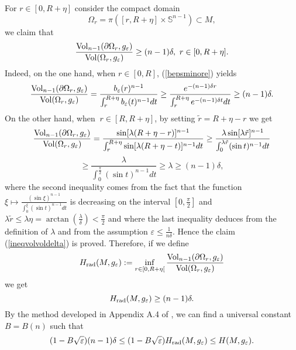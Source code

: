 \documentclass[11pt, reqno]{amsart}
\theoremstyle{plain}
\begin{document}
For $r\in [0, R+\eta]$  consider the compact domain
$$\Omega_r=\pi ( [r, R+\eta]\times \mathbb S^{n-1})\subset M,$$
we claim that   
\begin{equation}\label{ineqvolvoldelta}
\frac{{\rm Vol}_{n-1}(\partial\Omega_r, g_{\varepsilon})}{{\rm Vol} (\Omega_r, g_{\varepsilon})}\geq (n-1)\delta, \ r\in [0, R+\eta].
\end{equation}
Indeed, on the one hand,   when  $r\in [0, R]$, 
(\ref{bepsminore}) 
yields 
$$\frac{{\rm Vol}_{n-1}(\partial\Omega_r, g_{\varepsilon})}{{\rm Vol} (\Omega_r, g_{\varepsilon})}=\frac{b_{\varepsilon}(r)^{n-1}}{\int_r^{R+\eta}b_{\varepsilon}(t)^{n-1}dt}
\geq \frac{e^{-(n-1)\delta r}}{\int_r^{R+\eta}e^{-(n-1)\delta t}dt}
\geq (n-1)\delta .$$
On the other  hand,  when $\ r\in [R, R+\eta]$, by setting $\tilde r=R+\eta -r$ we get
$$\frac{{\rm Vol}_{n-1}(\partial\Omega_r, g_{\varepsilon})}{{\rm Vol} (\Omega_r, g_{\varepsilon})}=\frac{\sin[\lambda (R+\eta -r)]^{n-1}}{\int_r^{R+\eta}\sin[\lambda (R+\eta -t)]^{n-1}dt}
\geq \frac{\lambda\sin[\lambda \tilde r]^{n-1}}{\int_0^{\lambda\tilde r}(\sin t)^{n-1}dt}$$
$$\geq \frac{\lambda}{\int_0^{\frac{\pi}{2}}(\sin t)^{n-1}dt}\geq \lambda
\geq (n-1)\delta ,$$
where the second inequality comes from the fact that the function $\xi \mapsto 
\frac{(\sin \xi )^{n-1}}{\int_0^{\xi}(\sin t)^{n-1}dt}$
is decreasing on the interval $[0, \frac{\pi}{2}]$ 
and $\lambda \tilde r\leq \lambda \eta =\arctan (\frac{\lambda}{\delta})<\frac{\pi}{2}$
and where the last inequality deduces from the definition of $\lambda$
and from the assumption
$\varepsilon \leq \frac{1}{n\delta}$. Hence the claim  (\ref{ineqvolvoldelta}) is proved.
Therefore, if we define
$$H_{\rm rad}(M, g_{\varepsilon}):=\inf_{r\in [0, R+\eta[}\frac{{\rm Vol}_{n-1}(\partial \Omega_r, g_{\varepsilon})}{{\rm Vol}(\Omega_r, g_{\varepsilon})}$$
we get 
$$H_{\rm rad}(M, g_{\varepsilon})\geq  (n-1)\delta .$$
By the method developed in Appendix A.4 of \cite{Ga2}, we can find a universal constant $B=B(n)$
such that
\begin{equation}\label{16}
(1-B\sqrt{\varepsilon})(n-1)\delta\leq (1-B\sqrt{\varepsilon})H_{\rm rad} (M, g_{\varepsilon})\leq H(M, g_{\varepsilon}).
\end{equation}
\end{document}
